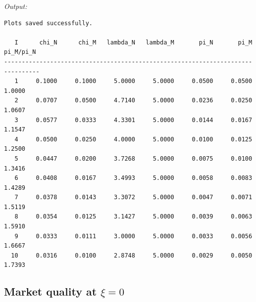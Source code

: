 \noindent\textit{Output:}
\begin{lstlisting}[style=outputstyle]
Plots saved successfully.

   I      chi_N      chi_M   lambda_N   lambda_M       pi_N       pi_M  pi_M/pi_N
--------------------------------------------------------------------------------
   1     0.1000     0.1000     5.0000     5.0000     0.0500     0.0500     1.0000
   2     0.0707     0.0500     4.7140     5.0000     0.0236     0.0250     1.0607
   3     0.0577     0.0333     4.3301     5.0000     0.0144     0.0167     1.1547
   4     0.0500     0.0250     4.0000     5.0000     0.0100     0.0125     1.2500
   5     0.0447     0.0200     3.7268     5.0000     0.0075     0.0100     1.3416
   6     0.0408     0.0167     3.4993     5.0000     0.0058     0.0083     1.4289
   7     0.0378     0.0143     3.3072     5.0000     0.0047     0.0071     1.5119
   8     0.0354     0.0125     3.1427     5.0000     0.0039     0.0063     1.5910
   9     0.0333     0.0111     3.0000     5.0000     0.0033     0.0056     1.6667
  10     0.0316     0.0100     2.8748     5.0000     0.0029     0.0050     1.7393
\end{lstlisting}

\subsection{Market quality at $\xi=0$}

